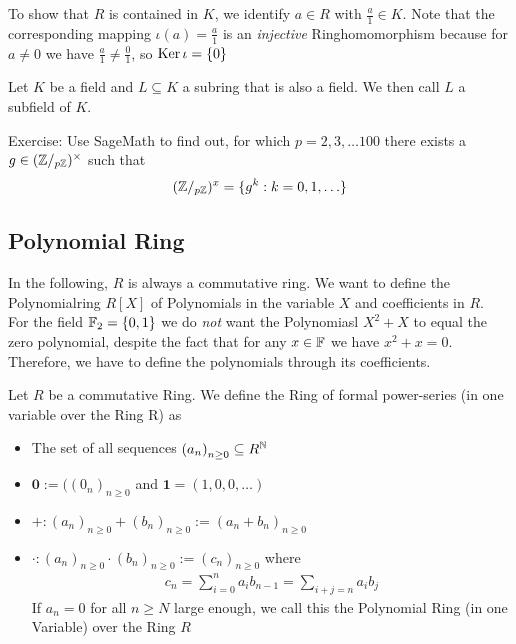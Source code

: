 To show that $R$ is contained in $K$, we identify $a \in R$ with $\frac{a}{1} \in K$. Note that the corresponding mapping $\iota(a) = \frac{a}{1}$ is an \emph{injective} Ringhomomorphism because for $a \neq 0$ we have $\frac{a}{1} \neq \frac{0}{1}$, so $\operatorname{Ker} \iota = \{0\}$

\begin{definition}[]
                                Let $K$ be a field and $L \subseteq K$ a subring that is also a field. We then call $L$ a subfield of $K$.
\end{definition}



Exercise: Use SageMath to find out, for which $p = 2, 3, \ldots 100$ there exists a $g \in (\mathbb{Z}/_{p \mathbb{Z}})^\times$ such that
\begin{align*}
                                (\mathbb{Z}/_{p\mathbb{Z}})^x = \{g^k: k = 0,1, \ldots\}
\end{align*}

\subsection{Polynomial Ring}
In the following, $R$ is always a commutative ring. We want to define the Polynomialring $R[X]$ of Polynomials in the variable $X$ and coefficients in $R$.\\

For the field $\mathbb{F}_2 = \{0,1\}$ we do \emph{not} want the Polynomiasl $X^2 + X$ to equal the zero polynomial, despite the fact that for any $x \in \mathbb{F}$ we have $x^2 + x = 0$. Therefore, we have to define the polynomials through its coefficients.\\

\begin{definition}
                                Let $R$ be a commutative Ring. We define the Ring of formal power-series (in one variable over the Ring R) as
        \begin{itemize}
                                        \item   The set of all sequences $\left(a_{n}\right)_{n \geq 0} \subseteq R^{\mathbb{N}}$
                                        \item $\bm{0} := (\left(0_{n}\right)_{n \geq 0}$ and $\bm{1} = (1,0,0, \ldots)$
                                        \item $+: (a_n)_{n \geq 0} + (b_n)_{n \geq 0} := (a_n + b_n)_{n\geq 0}$
                                        \item $\cdot: (a_n)_{n \geq 0} \cdot (b_n)_{n \geq 0} := (c_n)_{n \geq 0}$ where
                \begin{align*}
                c_n = \sum_{i = 0}^{n} a_i b_{n-1}  = \sum_{i+j = n} a_i b_j
                \end{align*}
        If $a_n = 0$ for all $n \geq N$ large enough, we call this the Polynomial Ring (in one Variable) over the Ring $R$      
        \end{itemize}
\end{definition}

